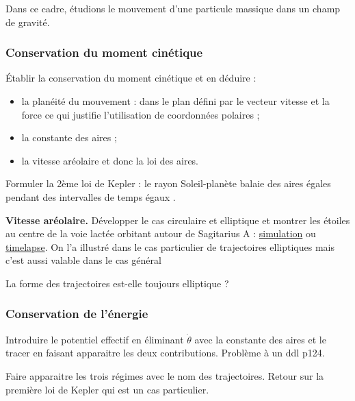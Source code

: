 \begin{transition}
Dans ce cadre, étudions le mouvement d'une particule massique dans un champ de gravité.
\end{transition}

\subsubsection{Conservation du moment cinétique}

Établir la conservation du moment cinétique et en déduire :
\begin{itemize}
\item la planéité du mouvement : dans le plan défini par le vecteur vitesse et la force ce qui justifie l'utilisation de coordonnées polaires ;
\item la constante des aires ;
\item la vitesse aréolaire et donc la loi des aires.
\end{itemize}

Formuler la 2ème loi de Kepler : \og le rayon Soleil-planète balaie des aires égales pendant des intervalles de temps égaux \fg{}.

\begin{slide}
\textbf{Vitesse aréolaire.}
Développer le cas circulaire et elliptique et montrer les étoiles au centre de la voie lactée orbitant autour de Sagitarius A : \href{https://www.youtube.com/watch?v=wyuj7-XE8RE}{simulation} ou \href{https://www.youtube.com/watch?v=TF8THY5spmo}{timelapse}.
On l'a illustré dans le cas particulier de trajectoires elliptiques mais c'est aussi valable dans le cas général
\end{slide}

\begin{transition}
La forme des trajectoires est-elle toujours elliptique ?
\end{transition}

\subsubsection{Conservation de l'énergie}

Introduire le potentiel effectif en éliminant $\dot{\theta}$ avec la constante des aires et le tracer en faisant apparaitre les deux contributions.
Problème à un ddl \cite{Bocquet2002} p124.

Faire apparaitre les trois régimes avec le nom des trajectoires.
Retour sur la première loi de Kepler qui est un cas particulier.

